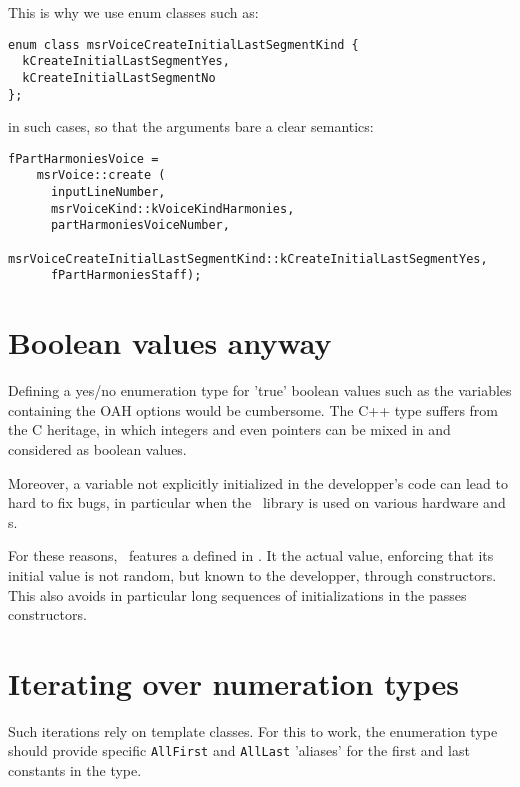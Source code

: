 This is why we use enum classes such as:
\begin{lstlisting}[language=CPlusPlus]
enum class msrVoiceCreateInitialLastSegmentKind {
  kCreateInitialLastSegmentYes,
  kCreateInitialLastSegmentNo
};
\end{lstlisting}

in such cases, so that the arguments bare a clear semantics:
\begin{lstlisting}[language=CPlusPlus]
  fPartHarmoniesVoice =
    msrVoice::create (
      inputLineNumber,
      msrVoiceKind::kVoiceKindHarmonies,
      partHarmoniesVoiceNumber,
      msrVoiceCreateInitialLastSegmentKind::kCreateInitialLastSegmentYes,
      fPartHarmoniesStaff);
\end{lstlisting}


\section{Boolean values anyway}

Defining a yes/no enumeration type for 'true' boolean values such as the variables containing the OAH options would be cumbersome. The C++  type suffers from the C heritage, in which integers and even pointers can be mixed in and considered as boolean values.

Moreover, a  variable not explicitly initialized in the developper's code can lead to hard to fix bugs, in particular when the \mf\ library is used on various hardware and \OS s.

For these reasons, \mf\ features a  defined in . It  the actual  value, enforcing that its initial value is not random, but known to the developper, through constructors. This also avoids in particular long sequences of initializations in the passes constructors.


\section{Iterating over numeration types}

Such iterations rely on template classes. For this to work, the enumeration type should provide specific {\tt AllFirst} and {\tt AllLast} 'aliases' for the first and last constants in the type.

